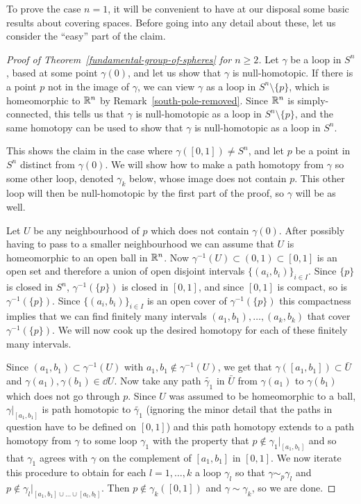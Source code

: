 To prove the case $n = 1$, it will be convenient to have at our disposal some basic results about covering spaces. Before going into any detail about these, let us consider the ``easy'' part of the claim.
\begin{proof}[Proof of Theorem~\ref{fundamental-group-of-spheres} for $n \geq 2$]
  Let $\gamma$ be a loop in $S^n$, based at some point $\gamma(0)$, and let us show that $\gamma$ is null-homotopic. If there is a point $p$ not in the image of $\gamma$, we can view $\gamma$ as a loop in $S^n \setminus \{p\}$, which is homeomorphic to $\mathbb{R}^n$ by Remark~\ref{south-pole-removed}. Since $\mathbb{R}^n$ is simply-connected, this tells us that $\gamma$ is null-homotopic as a loop in $S^n \setminus \{ p \}$, and the same homotopy can be used to show that $\gamma$ is null-homotopic as a loop in $S^n$.
  
  This shows the claim in the case where $\gamma([0,1]) \not= S^n$, and let $p$ be a point in $S^n$ distinct from $\gamma(0)$. We will show how to make a path homotopy from $\gamma$ so some other loop, denoted $\gamma_k$ below, whose image does not contain $p$. This other loop will then be null-homotopic by the first part of the proof, so $\gamma$ will be as well.
  
  Let $U$ be any neighbourhood of $p$ which does not contain $\gamma(0)$. After possibly having to pass to a smaller neighbourhood we can assume that $U$ is homeomorphic to an open ball in $\mathbb{R}^n$. Now $\gamma^{-1}(U) \subset (0,1) \subset [0,1]$ is an open set and therefore a union of open disjoint intervals $\{(a_i,b_i)\}_{i \in I}$. Since $\{p\}$ is closed in $S^n$, $\gamma^{-1}(\{p\})$ is closed in $[0,1]$, and since $[0,1]$ is compact, so is $\gamma^{-1}(\{p\})$. Since $\{(a_i,b_i)\}_{i \in I}$ is an open cover of $\gamma^{-1}(\{p\})$ this compactness implies that we can find finitely many intervals $(a_1,b_1), \dots, (a_k,b_k)$ that cover $\gamma^{-1}(\{p\})$. We will now cook up the desired homotopy for each of these finitely many intervals.
  
  Since $(a_1,b_1) \subset \gamma^{-1}(U)$ with $a_1,b_1 \notin \gamma^{-1}(U)$, we get that $\gamma([a_1,b_1]) \subset \bar{U}$ and $\gamma(a_1),\gamma(b_1) \in \dd U$. Now take any path $\tilde{\gamma_1}$ in $\bar{U}$ from $\gamma(a_1)$ to $\gamma(b_1)$ which does not go through $p$. Since $U$ was assumed to be homeomorphic to a ball, $\gamma|_{[a_1,b_1]}$ is path homotopic to $\tilde{\gamma_1}$ (ignoring the minor detail that the paths in question have to be defined on $[0,1]$) and this path homotopy extends to a path homotopy from $\gamma$ to some loop $\gamma_1$ with the property that $p \notin \gamma_1|_{[a_1,b_1]}$ and so that $\gamma_1$ agrees with $\gamma$ on the complement of $[a_1,b_1]$ in $[0,1]$. We now iterate this procedure to obtain for each $l = 1, \dots, k$ a loop $\gamma_l$ so that $\gamma \sim_p \gamma_l$ and $p \notin \gamma_l|_{[a_1,b_1] \cup \dots \cup [a_l,b_l]}$. Then $p \notin \gamma_k([0,1])$ and $\gamma \sim \gamma_k$, so we are done.
\end{proof}


